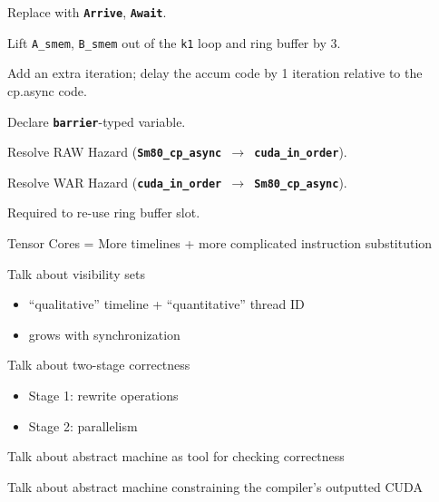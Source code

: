 {\LARGE
Replace with \textbf{\texttt{Arrive}}, \textbf{\texttt{Await}}.
}

\newpage
{}

{\large

}

{\LARGE

Lift \texttt{A\_smem}, \texttt{B\_smem} out of the \texttt{k1} loop and ring buffer by 3.

}

\newpage
{}

{\large

}

{\LARGE

Add an extra  iteration; delay the accum code by 1 iteration relative to the cp.async code.

}

\newpage
{}

{\large

}

{\LARGE
Declare \textbf{\texttt{barrier}}-typed variable.

}

\newpage
{}

{\large

}

{\LARGE
Resolve RAW Hazard (\textbf{\texttt{Sm80\_cp\_async $\to$ cuda\_in\_order}}).

}

\newpage
{}

{\large

}

{\LARGE
Resolve WAR Hazard (\textbf{\texttt{cuda\_in\_order $\to$ Sm80\_cp\_async}}).

Required to re-use ring buffer slot.

}

\newpage
{}

{\LARGE

Tensor Cores = More timelines + more complicated instruction substitution

}

\newpage
{}

{\LARGE

Talk about visibility sets
\begin{itemize}
  \item ``qualitative'' timeline + ``quantitative'' thread ID
  \item grows with synchronization
\end{itemize}

Talk about two-stage correctness
\begin{itemize}
  \item Stage 1: rewrite operations
  \item Stage 2: parallelism
\end{itemize}

Talk about abstract machine as tool for checking correctness

Talk about abstract machine constraining the compiler's outputted CUDA

}


